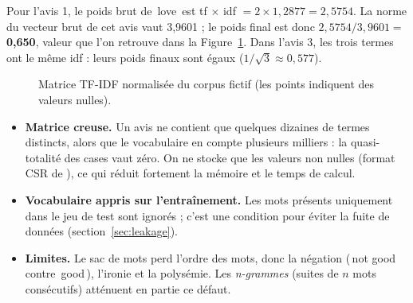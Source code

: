 \documentclass[11pt,a4paper]{report}
\makeatletter
\def\og{\guillemotleft\nobreak\,}%
\def\fg{\unskip\nobreak\,\guillemotright}%
\newcommand{\gl}[1]{\og #1\fg{}}       %
\numberwithin{equation}{chapter}
\DeclareRobustCommand{\code}[1]{{\ttfamily\fontsize{\strip@pt\dimexpr\f@size pt*9/10\relax}{\f@baselineskip}\selectfont\detokenize{#1}}}
\makeatother
\begin{document}
Pour l'avis 1, le poids brut de \gl{love} est tf $\times$ idf $= 2 \times 1{,}2877 = 2{,}5754$. La norme du vecteur brut de cet avis vaut 3,9601 ; le poids final est donc $2{,}5754 / 3{,}9601 =$ \textbf{0,650}, valeur que l'on retrouve dans la Figure~\ref{fig:tfidf}. Dans l'avis 3, les trois termes ont le même idf : leurs poids finaux sont égaux ($1/\sqrt{3} \approx 0{,}577$).

\begin{figure}[!htbp]
\centering
{}
\caption{Matrice TF-IDF normalisée du corpus fictif (les points indiquent des valeurs nulles).}\label{fig:tfidf}
\end{figure}

\begin{itemize}
\item \textbf{Matrice creuse.} Un avis ne contient que quelques dizaines de termes distincts, alors que le vocabulaire en compte plusieurs milliers : la quasi-totalité des cases vaut zéro. On ne stocke que les valeurs non nulles (format CSR de \code{scipy.sparse}), ce qui réduit fortement la mémoire et le temps de calcul.
\item \textbf{Vocabulaire appris sur l'entraînement.} Les mots présents uniquement dans le jeu de test sont ignorés ; c'est une condition pour éviter la fuite de données (section~\ref{sec:leakage}).
\item \textbf{Limites.} Le sac de mots perd l'ordre des mots, donc la négation (\gl{not good} contre \gl{good}), l'ironie et la polysémie. Les \textit{n-grammes} (suites de $n$ mots consécutifs) atténuent en partie ce défaut.
\end{itemize}
\end{document}
